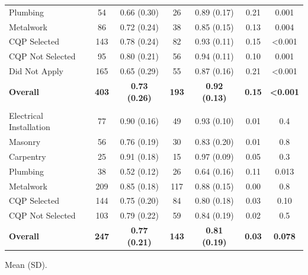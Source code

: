 \documentclass[
  11pt,
a4paper
]{report}
\begin{document}
\begin{table}[H]
{\begin{threeparttable}
\begin{tabular}[t]{lcccccc}
\hspace{1em}Plumbing & 54 & 0.66 (0.30) & 26 & 0.89 (0.17) & 0.21 & 0.001\\
\hspace{1em}Metalwork & 86 & 0.72 (0.24) & 38 & 0.85 (0.15) & 0.13 & 0.004\\
\hspace{1em}CQP Selected & 143 & 0.78 (0.24) & 82 & 0.93 (0.11) & 0.15 & <0.001\\
\hspace{1em}CQP Not Selected & 95 & 0.80 (0.21) & 56 & 0.94 (0.11) & 0.10 & 0.001\\
\hspace{1em}Did Not Apply & 165 & 0.65 (0.29) & 55 & 0.87 (0.16) & 0.21 & <0.001\\
\textbf{\hspace{1em}Overall} & \textbf{403} & \textbf{0.73 (0.26)} & \textbf{193} & \textbf{0.92 (0.13)} & \textbf{0.15} & \textbf{<0.001}\\
\addlinespace[0.3em]
\multicolumn{7}{l}{\textbf{Knowledge²}}\\
\hspace{1em}Electrical Installation & 77 & 0.90 (0.16) & 49 & 0.93 (0.10) & 0.01 & 0.4\\
\hspace{1em}Masonry & 56 & 0.76 (0.19) & 30 & 0.83 (0.20) & 0.01 & 0.8\\
\hspace{1em}Carpentry & 25 & 0.91 (0.18) & 15 & 0.97 (0.09) & 0.05 & 0.3\\
\hspace{1em}Plumbing & 38 & 0.52 (0.12) & 26 & 0.64 (0.16) & 0.11 & 0.013\\
\hspace{1em}Metalwork & 209 & 0.85 (0.18) & 117 & 0.88 (0.15) & 0.00 & 0.8\\
\hspace{1em}CQP Selected & 144 & 0.75 (0.20) & 84 & 0.80 (0.18) & 0.03 & 0.10\\
\hspace{1em}CQP Not Selected & 103 & 0.79 (0.22) & 59 & 0.84 (0.19) & 0.02 & 0.5\\
\textbf{\hspace{1em}Overall} & \textbf{247} & \textbf{0.77 (0.21)} & \textbf{143} & \textbf{0.81 (0.19)} & \textbf{0.03} & \textbf{0.078}\\
\bottomrule
\end{tabular}
\begin{tablenotes}
\small
\item Mean (SD).

\end{tablenotes}
\end{threeparttable}}
\end{table}
\end{document}
